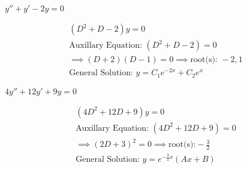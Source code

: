 \item [Example 1] $y''+y'-2y=0$

\begin{gather*}
    (D^2+D-2)y=0\\
    \text{Auxillary Equation: }(D^2+D-2)=0\\
    \implies (D+2)(D-1)=0 \implies \text{root(s): }-2,1\\
    \text{General Solution: } y=C_1e^{-2x}+C_2e^x
\end{gather*}

\item [Example 2] $4y''+12y'+9y=0$

\begin{gather*}
    (4D^2+12D+9)y=0\\
    \text{Auxillary Equation: }(4D^2+12D+9)=0\\
    \implies (2D+3)^2=0 \implies \text{root(s):}-\frac{3}{2}\\
    \text{General Solution: } y=e^{-\frac{3}{2}x}(Ax+B)
\end{gather*}


